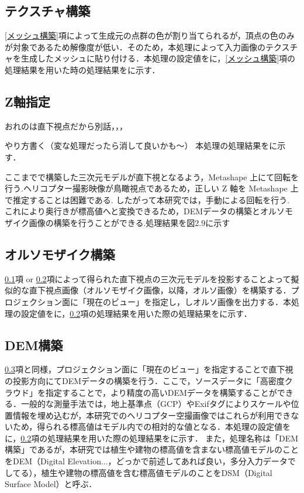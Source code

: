     \subsection{テクスチャ構築}
      \label{テクスチャ構築}
      \ref{メッシュ構築}項によって生成元の点群の色が割り当てられるが，頂点の色のみが対象であるため解像度が低い．そのため，本処理によって入力画像のテクスチャを生成したメッシュに貼り付ける．本処理の設定値を\fref{}に，\ref{メッシュ構築}項の処理結果を用いた時の処理結果を\fref{}に示す．

    \subsection{Z軸指定}
      \label{Z軸指定}
      おれのは直下視点だから別話，，，

      やり方書く（変な処理だったら消して良いかも〜）
      本処理の処理結果を\fref{}に示す．




      ここまでで構築した三次元モデルが直下視となるよう，Metashape 上にて回転を行う.ヘリコプター撮影映像が鳥瞰視点であるため，正しい Z 軸を Metashape 上で推定することは困難である. したがって本研究では，手動による回転を行う.
      これにより奥行きが標高値へと変換できるため，DEMデータの構築とオルソモザイク画像の構築を行うことができる.処理結果を図2.9に示す

    \subsection{オルソモザイク構築}
      \label{オルソモザイク構築}
      \ref{テクスチャ構築}項 or \ref{Z軸指定}項によって得られた直下視点の三次元モデルを投影することよって擬似的な直下視点画像（オルソモザイク画像，以降，オルソ画像）を構築する．プロジェクション面に「現在のビュー」を指定し，しオルソ画像を出力する．本処理の設定値を\fref{}に，\ref{Z軸指定}項の処理結果を用いた際の処理結果を\fref{}に示す．
      
    \subsection{DEM構築}
      \label{DEM構築}
      \ref{オルソモザイク構築}項と同様，プロジェクション面に「現在のビュー」を指定することで直下視の投影方向にてDEMデータの構築を行う．ここで，ソースデータに「高密度クラウド」を指定することで，より精度の高いDEMデータを構築することができる．一般的な測量手法では，地上基準点（GCP）やExifタグによりスケールや位置情報を埋め込むが，本研究でのヘリコプター空撮画像ではこれらが利用できないため，得られる標高値はモデル内での相対的な値となる．本処理の設定値を\fref{}に，\ref{Z軸指定}項の処理結果を用いた際の処理結果を\fref{}に示す．
      また，処理名称は「DEM構築」であるが，本研究では植生や建物の標高値を含まない標高値モデルのことをDEM（Digital Elevation...，どっかで前述してあれば良い，多分入力データでしてる），植生や建物の標高値を含む標高値モデルのことをDSM（Digital Surface Model）と呼ぶ．


